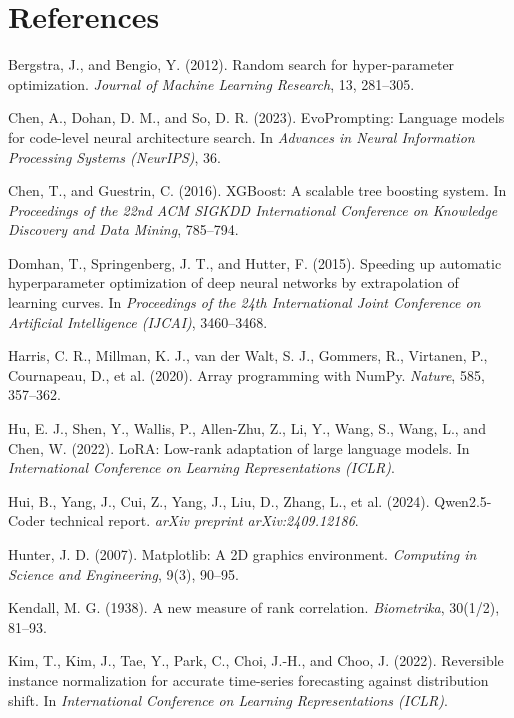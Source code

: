 \documentclass[11pt,letterpaper]{article}
\begin{document}
\section*{References}
\begin{list}{}{\setlength{\leftmargin}{1.5em}\setlength{\itemindent}{-1.5em}\setlength{\itemsep}{2pt}\setlength{\parsep}{0pt}}\small
\item Bergstra, J., and Bengio, Y. (2012). Random search for hyper-parameter optimization. \textit{Journal of Machine Learning Research}, 13, 281--305.
\item Chen, A., Dohan, D. M., and So, D. R. (2023). EvoPrompting: Language models for code-level neural architecture search. In \textit{Advances in Neural Information Processing Systems (NeurIPS)}, 36.
\item Chen, T., and Guestrin, C. (2016). XGBoost: A scalable tree boosting system. In \textit{Proceedings of the 22nd ACM SIGKDD International Conference on Knowledge Discovery and Data Mining}, 785--794.
\item Domhan, T., Springenberg, J. T., and Hutter, F. (2015). Speeding up automatic hyperparameter optimization of deep neural networks by extrapolation of learning curves. In \textit{Proceedings of the 24th International Joint Conference on Artificial Intelligence (IJCAI)}, 3460--3468.
\item Harris, C. R., Millman, K. J., van der Walt, S. J., Gommers, R., Virtanen, P., Cournapeau, D., et al. (2020). Array programming with NumPy. \textit{Nature}, 585, 357--362.
\item Hu, E. J., Shen, Y., Wallis, P., Allen-Zhu, Z., Li, Y., Wang, S., Wang, L., and Chen, W. (2022). LoRA: Low-rank adaptation of large language models. In \textit{International Conference on Learning Representations (ICLR)}.
\item Hui, B., Yang, J., Cui, Z., Yang, J., Liu, D., Zhang, L., et al. (2024). Qwen2.5-Coder technical report. \textit{arXiv preprint arXiv:2409.12186}.
\item Hunter, J. D. (2007). Matplotlib: A 2D graphics environment. \textit{Computing in Science and Engineering}, 9(3), 90--95.
\item Kendall, M. G. (1938). A new measure of rank correlation. \textit{Biometrika}, 30(1/2), 81--93.
\item Kim, T., Kim, J., Tae, Y., Park, C., Choi, J.-H., and Choo, J. (2022). Reversible instance normalization for accurate time-series forecasting against distribution shift. In \textit{International Conference on Learning Representations (ICLR)}.

\end{list}
\end{document}
